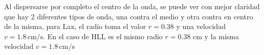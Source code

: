 \documentclass[12pt,a4paper]{book}
\begin{document}
Al dispersarse por completo el centro de la onda, se puede ver con mejor claridad que hay 2 diferentes tipos de onda, una contra el medio y otra contra en centro de la misma, para Lax, el radio toma el valor $r = 0.38$ y una velocidad $v = 1.8 \, \mathrm{cm}/\mathrm{s} $. En el caso de HLL es el mismo radio $r = 0.38 $ cm y la misma velocidad $v = 1.8 \, \mathrm{cm}/\mathrm{s}$

\begin{figure}[H]
\centering
{}

\end{figure}
\end{document}

